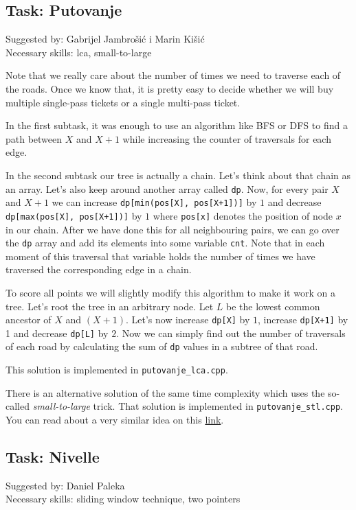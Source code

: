 \documentclass[a4paper]{article}
\begin{document}
\clearpage

\subsection*{Task: Putovanje}
\textsf{Suggested by: Gabrijel Jambrošić i Marin Kišić}\\
\textsf{Necessary skills: lca, small-to-large}

Note that we really care about the number of times we need to traverse
each of the roads. Once we know that, it is pretty easy to decide whether
we will buy multiple single-pass tickets or a single multi-pass ticket.

In the first subtask, it was enough to use an algorithm like BFS or DFS to
find a path between $X$ and $X+1$ while increasing the counter of traversals
for each edge.

In the second subtask our tree is actually a chain. Let's think about that
chain as an array. Let's also keep around another array called \texttt{dp}.
Now, for every pair $X$ and $X+1$ we can increase \texttt{dp[min(pos[X], pos[X+1])]}
by $1$ and decrease \texttt{dp[max(pos[X], pos[X+1])]} by $1$ where \texttt{pos[x]}
denotes the position of node $x$ in our chain. After we have done this for all
neighbouring pairs, we can go over the \texttt{dp} array and add its elements
into some variable \texttt{cnt}. Note that in each moment of this traversal that
variable holds the number of times we have traversed the corresponding edge
in a chain.

To score all points we will slightly modify this algorithm to make it work
on a tree. Let's root the tree in an arbitrary node. Let $L$ be the lowest
common ancestor of $X$ and $(X+1)$. Let's now increase \texttt{dp[X]} by
$1$, increase \texttt{dp[X+1]} by 1 and decrease \texttt{dp[L]} by $2$.
Now we can simply find out the number of traversals of each road by calculating
the sum of \texttt{dp} values in a subtree of that road. 

This solution is implemented in \texttt{putovanje\_lca.cpp}.

There is an alternative solution of the same time complexity which uses the
so-called \textit{small-to-large} trick. That solution is implemented in
\texttt{putovanje\_stl.cpp}. You can read about a very similar idea
on this \href{https://codeforces.com/blog/entry/72017#comment-563190}{link}.


\subsection*{Task: Nivelle}
\textsf{Suggested by: Daniel Paleka}\\
\textsf{Necessary skills: sliding window technique, two pointers}
\end{document}
